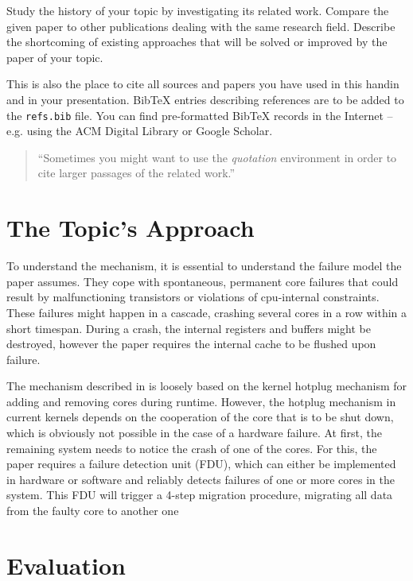 \documentclass[a4paper,10pt,twoside]{article}
\begin{document}
Study the history of your topic by investigating its related work.
Compare the given paper to other publications dealing with the same research field.
Describe the shortcoming of existing approaches that will be solved or improved by the paper of your topic.

This is also the place to cite all sources and papers you have used in this handin and in your presentation. 
Bib\TeX$\!$ entries describing references are to be added to the \verb|refs.bib| file. 
You can find pre-formatted Bib\TeX$\!$ records in the Internet -- e.g. using the ACM Digital Library or Google Scholar.

\begin{quotation}
	``Sometimes you might want to use the \emph{quotation} environment in order to cite larger passages of the related work.''
\end{quotation}

\section{The Topic's Approach}

To understand the mechanism, it is essential to understand the failure model the paper assumes. They cope with spontaneous, permanent core failures that could result by malfunctioning transistors or violations of cpu-internal constraints. These failures might happen in a cascade, crashing several cores in a row within a short timespan. During a crash, the internal registers and buffers might be destroyed, however the paper requires the internal cache to be flushed upon failure.

The mechanism described in \cite{CSR} is loosely based on the kernel hotplug mechanism for adding and removing cores during runtime. However, the hotplug mechanism in current kernels depends on the cooperation of the core that is to be shut down, which is obviously not possible in the case of a hardware failure. At first, the remaining system needs to notice the crash of one of the cores. For this, the paper requires a failure detection unit (FDU), which can either be implemented in hardware or software and reliably detects failures of one or more cores in the system. This FDU will trigger a 4-step migration procedure, migrating all data from the faulty core to another one

\section{Evaluation}
\end{document}
